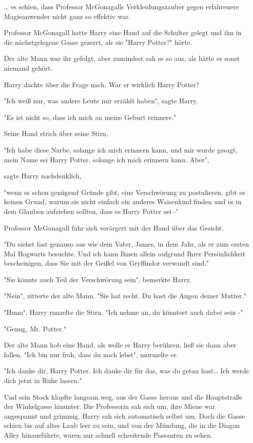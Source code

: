 {… es schien, dass Professor McGonagalls Verkleidungszauber gegen erfahrenere Magieanwender nicht ganz so effektiv war.

Professor McGonagall hatte Harry eine Hand auf die Schulter gelegt und ihn in die nächstgelegene Gasse gezerrt, als sie "Harry Potter?" hörte.

Der alte Mann war ihr gefolgt, aber zumindest sah es so aus, als hätte es sonst niemand gehört.

Harry dachte über die Frage nach. War er wirklich Harry Potter?

"Ich weiß nur, was andere Leute mir erzählt haben", sagte Harry.

"Es ist nicht so, dass ich mich an meine Geburt erinnere."

Seine Hand strich über seine Stirn.

"Ich habe diese Narbe, solange ich mich erinnern kann, und mir wurde gesagt, mein Name sei Harry Potter, solange ich mich erinnern kann. Aber",

sagte Harry nachdenklich,

"wenn es schon genügend Gründe gibt, eine Verschwörung zu postulieren, gibt es keinen Grund, warum sie nicht einfach ein anderes Waisenkind finden und es in dem Glauben aufziehen sollten, dass es Harry Potter sei -"

Professor McGonagall fuhr sich verärgert mit der Hand über das Gesicht.

"Du siehst fast genauso aus wie dein Vater, James, in dem Jahr, als er zum ersten Mal Hogwarts besuchte. Und ich kann Ihnen allein aufgrund Ihrer Persönlichkeit bescheinigen, dass Sie mit der Geißel von Gryffindor verwandt sind."

"Sie könnte auch Teil der Verschwörung sein", bemerkte Harry.

"Nein", zitterte der alte Mann. "Sie hat recht. Du hast die Augen deiner Mutter."

"Hmm", Harry runzelte die Stirn. "Ich nehme an, du könntest auch dabei sein -"

"Genug, Mr. Potter."

Der alte Mann hob eine Hand, als wolle er Harry berühren, ließ sie dann aber fallen. "Ich bin nur froh, dass du noch lebst", murmelte er.

"Ich danke dir, Harry Potter. Ich danke dir für das, was du getan hast… Ich werde dich jetzt in Ruhe lassen."

Und sein Stock klopfte langsam weg, aus der Gasse heraus und die Hauptstraße der Winkelgasse hinunter. Die Professorin sah sich um, ihre Miene war angespannt und grimmig. Harry sah sich automatisch selbst um. Doch die Gasse schien bis auf altes Laub leer zu sein, und von der Mündung, die in die Diagon Alley hinausführte, waren nur schnell schreitende Passanten zu sehen.

}
